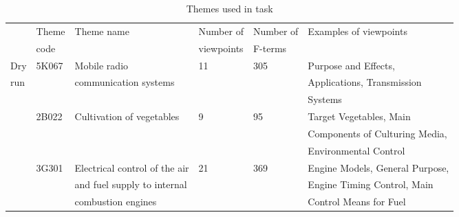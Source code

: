 \documentclass[english]{jnlp_1.2c}
\begin{document}
\begin{table}[t]
\caption{Themes used in task}
\label{tab:theme-ex}
\begin{footnotesize}
\begin{center}
    \begin{tabular}{|l|l|l|l|l|l|} \hline
                                                                & Theme & Theme name                                     & Number of  & Number of & Examples of viewpoints      \\
                                                                & code  &                                                                & viewpoints & F-terms   &                                             \\\hline
                                                Dry     & 5K067 & Mobile radio                                   & 11 & 305 & Purpose and Effects,                              \\
                                                run     &               & communication systems                  &    &         & Applications, Transmission            \\
                                                                &               &                                                                &    &         & Systems                                            \\\hline
\multicolumn{1}{|l|}{}                  & 2B022 & Cultivation of vegetables      & 9  & 95      & Target Vegetables, Main                       \\
\multicolumn{1}{|l|}{}                  &               &                                                        &    &         & Components of Culturing Media,        \\
\multicolumn{1}{|l|}{}                  &               &                                                        &    &         & Environmental Control                       \\\cline{2-6}
\multicolumn{1}{|l|}{}                  & 3G301 & Electrical control of the air  & 21 & 369 & Engine Models, General Purpose,   \\
\multicolumn{1}{|l|}{}                  &               & and fuel supply to internal    &    &         & Engine Timing Control, Main           \\
\multicolumn{1}{|l|}{}                  &               & combustion engines                     &    &         & Control Means for Fuel                      \\\cline{2-6}

\end{tabular}
\end{center}
\end{footnotesize}
\end{table}
\end{document}
